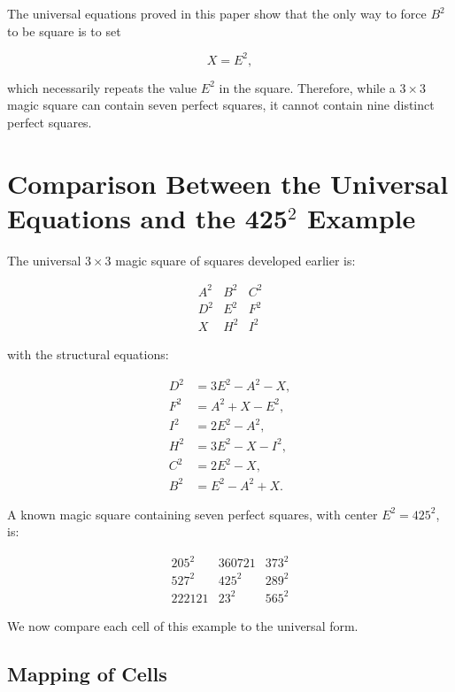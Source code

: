 \documentclass[12pt]{article}
\begin{document}
The universal equations proved in this paper show that the only way to
force $B^2$ to be square is to set


\[
X = E^2,
\]


which necessarily repeats the value $E^2$ in the square.  
Therefore, while a $3\times 3$ magic square can contain seven perfect squares,
it cannot contain nine distinct perfect squares.

\section*{Comparison Between the Universal Equations and the 425$^2$ Example}

The universal $3\times 3$ magic square of squares developed earlier is:



\[
\begin{matrix}
A^2 & B^2 & C^2 \\
D^2 & E^2 & F^2 \\
X   & H^2 & I^2
\end{matrix}
\]



with the structural equations:


\[
\begin{aligned}
D^2 &= 3E^2 - A^2 - X, \\
F^2 &= A^2 + X - E^2, \\
I^2 &= 2E^2 - A^2, \\
H^2 &= 3E^2 - X - I^2, \\
C^2 &= 2E^2 - X, \\
B^2 &= E^2 - A^2 + X.
\end{aligned}
\]



A known magic square containing seven perfect squares, with center $E^2 = 425^2$, is:



\[
\begin{matrix}
205^2   & 360721 & 373^2 \\
527^2   & 425^2  & 289^2 \\
222121  & 23^2   & 565^2
\end{matrix}
\]



We now compare each cell of this example to the universal form.

\subsection*{Mapping of Cells}
\end{document}
